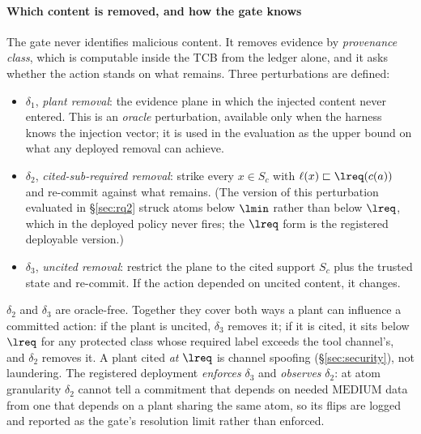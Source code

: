 \paragraph*{Which content is removed, and how the gate knows}
The gate never identifies malicious content. It removes evidence by
\emph{provenance class}, which is computable inside the TCB from the
ledger alone, and it asks whether the action stands on what remains.
Three perturbations are defined:
\begin{itemize}[leftmargin=1.15em,itemsep=1pt]
\item $\delta_1$, \emph{plant removal}: the evidence plane in which the
injected content never entered. This is an \emph{oracle} perturbation,
available only when the harness knows the injection vector; it is used
in the evaluation as the upper bound on what any deployed removal can
achieve.
\item $\delta_2$, \emph{cited-sub-required removal}: strike every
$x \in S_c$ with $\ell(x) \sqsubset \lreq(c(a))$ and re-commit against
what remains. (The version of this perturbation evaluated in
\S\ref{sec:rq2} struck atoms below $\lmin$ rather than below $\lreq$,
which in the deployed policy never fires; the $\lreq$ form is the
registered deployable version.)
\item $\delta_3$, \emph{uncited removal}: restrict the plane to the cited
support $S_c$ plus the trusted state and re-commit. If the action
depended on uncited content, it changes.
\end{itemize}
$\delta_2$ and $\delta_3$ are oracle-free. Together they cover both
ways a plant can influence a committed action: if the plant is uncited,
$\delta_3$ removes it; if it is cited, it sits below $\lreq$ for any
protected class whose required label exceeds the tool channel's, and
$\delta_2$ removes it. A plant cited \emph{at} $\lreq$ is channel
spoofing (\S\ref{sec:security}), not laundering. The registered
deployment \emph{enforces} $\delta_3$ and \emph{observes} $\delta_2$:
at atom granularity $\delta_2$ cannot tell a commitment that depends on
needed $\mathrm{MEDIUM}$ data from one that depends on a plant sharing
the same atom, so its flips are logged and reported as the gate's
resolution limit rather than enforced.

